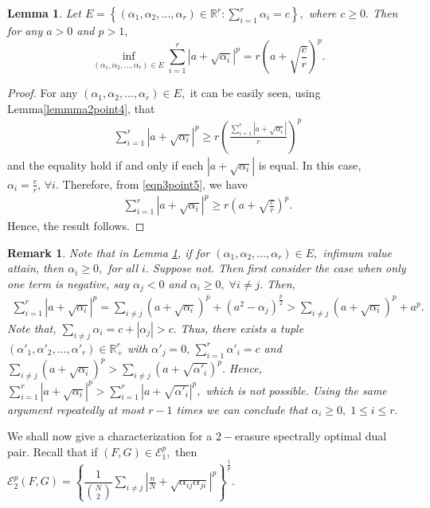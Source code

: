 \documentclass[final,1p,times]{elsarticle}
\newtheorem{lem}[thm]{Lemma}
\newtheorem{rem}[thm]{Remark}
\begin{document}
\begin{lem}\label{lem3point5}
	Let $E = \left\{(\alpha_1,\alpha_2, \ldots, \alpha_r) \in \mathbb{R}^r : \sum\limits_{i=1}^r \alpha_i = c\right\},$ where $c\geq 0.$ Then for any 
	$a>0$ and $p>1,$ 
	$$ \inf\limits_{(\alpha_1,\alpha_2, \ldots, \alpha_r) \in E} \sum\limits_{i=1}^r \left| a+ \sqrt{\alpha_i}  \right|^p = r\left(a+ \sqrt{\frac{c}{r}}  \right)^p.$$
\end{lem}

\begin{proof}
	For any ${(\alpha_1,\alpha_2, \ldots, \alpha_r) \in E}, $ it can be easily seen,  using Lemma\ref{lemmma2point4}, that 
	\begin{eqnarray}\label{eqn3point5}
		\sum\limits_{i=1}^r \left| a+ \sqrt{\alpha_i}  \right|^p \geq r \left( \frac{\sum\limits_{i=1}^r \left| a+ \sqrt{\alpha_i}  \right|}{r}  \right)^p
	\end{eqnarray}
and the equality hold if and only if each $\left| a+ \sqrt{\alpha_i}  \right|$ is equal. In this case, $\alpha_i = \frac{c}{r},\,\forall i.$ Therefore, from \eqref{eqn3point5}, we have
\begin{eqnarray*}
	\sum\limits_{i=1}^r \left| a+ \sqrt{\alpha_i}  \right|^p \geq r\left(a+ \sqrt{\frac{c}{r}}  \right)^p. 
\end{eqnarray*}
Hence, the result follows.
\end{proof}

\begin{rem}
	Note that in Lemma \ref{lem3point5}, if for $(\alpha_1,\alpha_2, \ldots, \alpha_r) \in E,$ infimum value attain, then $\alpha_i \geq 0,$ for all $i.$ Suppose not. Then first consider the case when only one term is negative, say $\alpha_j <0$ and $\alpha_i \geq 0,\;\forall i \neq j.$ Then,
	\begin{eqnarray*}
			\sum\limits_{i=1}^r \left| a+ \sqrt{\alpha_i}  \right|^p = 	\sum\limits_{i \neq j}  \left( a+ \sqrt{\alpha_i}  \right)^p + \left(a^2 -\alpha_j \right)^{\frac{p}{2}} > 	\sum\limits_{i \neq j}  \left( a+ \sqrt{\alpha_i}  \right)^p + a^p.
	\end{eqnarray*}
Note that, $\sum\limits_{i \neq j} \alpha_i = c+ |\alpha_j| > c.$ Thus, there exists a tuple  $(\alpha'_1,\alpha'_2, \ldots, \alpha'_r) \in \mathbb{R}_{+}^r $ with $\alpha'_j =0,\,\sum\limits_{i=1}^r \alpha'_i = c$ and $\sum\limits_{i \neq j}  \left( a+ \sqrt{\alpha_i}  \right)^p > \sum\limits_{i \neq j}  \left( a+ \sqrt{\alpha'_i}  \right)^p.$ Hence, $\sum\limits_{i=1}^r \left| a+ \sqrt{\alpha_i}  \right|^p > \sum\limits_{i=1}^r \left| a+ \sqrt{\alpha'_i}  \right|^p,$ which is not possible. Using the same argument repeatedly at most $r-1$ times we can conclude that $\alpha_i \geq 0,\;1 \leq i \leq r.$
\end{rem}
\noindent
We shall now give a characterization for a $2-$erasure spectrally optimal dual pair. Recall that if $(F,G) \in \mathcal{E}_{1}^p,$ then $\mathcal{E}_{2}^p (F,G) = \left\{\dfrac{1}{\binom{N}{2}} \sum\limits_{i \neq j}\left|  \frac{n}{N} +  \sqrt{\alpha_{ij} \alpha_{ji}} \right|^p\right\}^{\frac{1}{p}} .$
\end{document}
